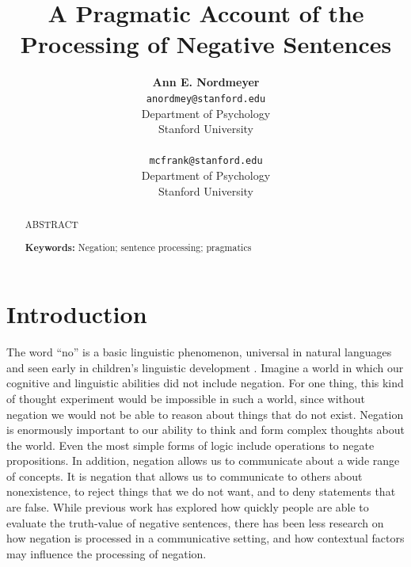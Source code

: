 \documentclass[10pt,letterpaper]{article}
\title{A Pragmatic Account of the Processing of Negative Sentences}
\author{{\large \bf Ann E. Nordmeyer} \\ \texttt{anordmey@stanford.edu}\\ Department of Psychology \\ Stanford University \\ 
\And {\large \bf Michael C. Frank} \\ \texttt{mcfrank@stanford.edu} \\ Department of Psychology \\ Stanford University \\ }
\begin{document}
\maketitle

\begin{abstract}

ABSTRACT

\textbf{Keywords:} 
Negation; sentence processing; pragmatics
\end{abstract}

\section{Introduction}

The word ``no'' is a basic linguistic phenomenon, universal in natural languages \cite{dahl2010} and seen early in children's linguistic development \cite{bloom1970, bloom1993, pea1980}.  Imagine a world in which our cognitive and linguistic abilities did not include negation.  For one thing, this kind of thought experiment would be impossible in such a world, since without negation we would not be able to reason about things that do not exist.  Negation is enormously important to our ability to think and form complex thoughts about the world.  Even the most simple forms of logic include operations to negate propositions.  In addition, negation allows us to communicate about a wide range of concepts.  It is negation that allows us to communicate to others about nonexistence, to reject things that we do not want, and to deny statements that are false.  While previous work has explored how quickly people are able to evaluate the truth-value of negative sentences, there has been less research on how negation is processed in a communicative setting, and how contextual factors may influence the processing of negation.  
\end{document}
